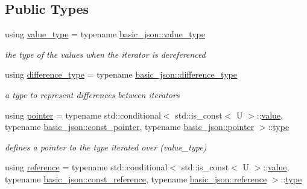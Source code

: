 \subsection*{Public Types}
\begin{DoxyCompactItemize}
\item 
using \hyperlink{classnlohmann_1_1basic__json_1_1iter__impl_a4d0518f3f2edae9dbaf7ef02f4f20add}{value\+\_\+type} = typename \hyperlink{classnlohmann_1_1basic__json_a2b3297873b70c080837e8eedc4fec32f}{basic\+\_\+json\+::value\+\_\+type}
\begin{DoxyCompactList}\small\item\em the type of the values when the iterator is dereferenced \end{DoxyCompactList}\item 
using \hyperlink{classnlohmann_1_1basic__json_1_1iter__impl_aa3d908ee643e5938d32e5f6d261d7715}{difference\+\_\+type} = typename \hyperlink{classnlohmann_1_1basic__json_afe7c1303357e19cea9527af4e9a31d8f}{basic\+\_\+json\+::difference\+\_\+type}
\begin{DoxyCompactList}\small\item\em a type to represent differences between iterators \end{DoxyCompactList}\item 
using \hyperlink{classnlohmann_1_1basic__json_1_1iter__impl_a3dddd7fa38b36e2531700ceb4a1ce9a8}{pointer} = typename std\+::conditional$<$ std\+::is\+\_\+const$<$ U $>$\+::\hyperlink{classnlohmann_1_1basic__json_1_1iter__impl_a92e849ca687355935c02f492be936b68}{value}, typename \hyperlink{classnlohmann_1_1basic__json_aff3d5cd2a75612364b888d8693231b58}{basic\+\_\+json\+::const\+\_\+pointer}, typename \hyperlink{classnlohmann_1_1basic__json_aefee1f777198c68724bd127e0c8abbe4}{basic\+\_\+json\+::pointer} $>$\+::\hyperlink{classnlohmann_1_1basic__json_a2b2d781d7f2a4ee41bc0016e931cadf7}{type}
\begin{DoxyCompactList}\small\item\em defines a pointer to the type iterated over (value\+\_\+type) \end{DoxyCompactList}\item 
using \hyperlink{classnlohmann_1_1basic__json_1_1iter__impl_ae09599e9cb4a947020a0265c0c4f3d5e}{reference} = typename std\+::conditional$<$ std\+::is\+\_\+const$<$ U $>$\+::\hyperlink{classnlohmann_1_1basic__json_1_1iter__impl_a92e849ca687355935c02f492be936b68}{value}, typename \hyperlink{classnlohmann_1_1basic__json_a4057c5425f4faacfe39a8046871786ca}{basic\+\_\+json\+::const\+\_\+reference}, typename \hyperlink{classnlohmann_1_1basic__json_ac6a5eddd156c776ac75ff54cfe54a5bc}{basic\+\_\+json\+::reference} $>$\+::\hyperlink{classnlohmann_1_1basic__json_a2b2d781d7f2a4ee41bc0016e931cadf7}{type}

\end{DoxyCompactItemize}
